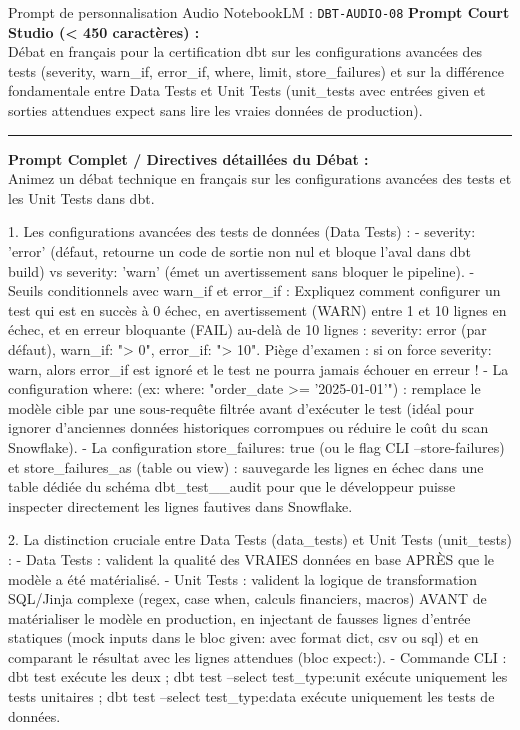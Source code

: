 \documentclass[11pt,a4paper]{article}
\begin{document}
\begin{promptbox}{Prompt de personnalisation Audio NotebookLM : \texttt{DBT-AUDIO-08}}
\textbf{Prompt Court Studio (< 450 caractères) :}\\
Débat en français pour la certification dbt sur les configurations avancées des tests (severity, warn\_if, error\_if, where, limit, store\_failures) et sur la différence fondamentale entre Data Tests et Unit Tests (unit\_tests avec entrées given et sorties attendues expect sans lire les vraies données de production).

\medskip\hrule\medskip
\textbf{Prompt Complet / Directives détaillées du Débat :}\\
Animez un débat technique en français sur les configurations avancées des tests et les Unit Tests dans dbt.

1. Les configurations avancées des tests de données (Data Tests) :
- severity: 'error' (défaut, retourne un code de sortie non nul et bloque l'aval dans dbt build) vs severity: 'warn' (émet un avertissement sans bloquer le pipeline).
- Seuils conditionnels avec warn\_if et error\_if :
  Expliquez comment configurer un test qui est en succès à 0 échec, en avertissement (WARN) entre 1 et 10 lignes en échec, et en erreur bloquante (FAIL) au-delà de 10 lignes :
  severity: error (par défaut), warn\_if: "> 0", error\_if: "> 10".
  Piège d'examen : si on force severity: warn, alors error\_if est ignoré et le test ne pourra jamais échouer en erreur !
- La configuration where: (ex: where: "order\_date >= '2025-01-01'") : remplace le modèle cible par une sous-requête filtrée avant d'exécuter le test (idéal pour ignorer d'anciennes données historiques corrompues ou réduire le coût du scan Snowflake).
- La configuration store\_failures: true (ou le flag CLI --store-failures) et store\_failures\_as (table ou view) : sauvegarde les lignes en échec dans une table dédiée du schéma dbt\_test\_\_audit pour que le développeur puisse inspecter directement les lignes fautives dans Snowflake.

2. La distinction cruciale entre Data Tests (data\_tests) et Unit Tests (unit\_tests) :
- Data Tests : valident la qualité des VRAIES données en base APRÈS que le modèle a été matérialisé.
- Unit Tests : valident la logique de transformation SQL/Jinja complexe (regex, case when, calculs financiers, macros) AVANT de matérialiser le modèle en production, en injectant de fausses lignes d'entrée statiques (mock inputs dans le bloc given: avec format dict, csv ou sql) et en comparant le résultat avec les lignes attendues (bloc expect:).
- Commande CLI : dbt test exécute les deux ; dbt test --select test\_type:unit exécute uniquement les tests unitaires ; dbt test --select test\_type:data exécute uniquement les tests de données.
\end{promptbox}
\end{document}
